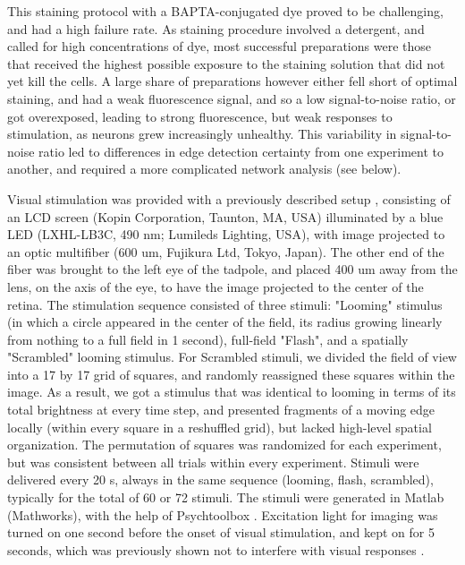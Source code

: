 \documentclass{article}
\begin{document}
This staining protocol with a BAPTA-conjugated dye proved to be challenging, and had a high failure rate. As staining procedure involved a detergent, and called for high concentrations of dye, most successful preparations were those that received the highest possible exposure to the staining solution that did not yet kill the cells. A large share of preparations however either fell short of optimal staining, and had a weak fluorescence signal, and so a low signal-to-noise ratio, or got overexposed, leading to strong fluorescence, but weak responses to stimulation, as neurons grew increasingly unhealthy. This variability in signal-to-noise ratio led to  differences in edge detection certainty from one experiment to another, and required a more complicated network analysis (see below).

Visual stimulation was provided with a previously described setup \citep{khakhalin2014}, consisting of an LCD screen (Kopin Corporation, Taunton, MA, USA) illuminated by a blue LED (LXHL-LB3C, 490 nm; Lumileds Lighting, USA), with image projected to an optic multifiber (600 um, Fujikura Ltd, Tokyo, Japan). The other end of the fiber was brought to the left eye of the tadpole, and placed 400 um away from the lens, on the axis of the eye, to have the image projected to the center of the retina. The stimulation sequence consisted of three stimuli: "Looming" stimulus (in which a circle appeared in the center of the field, its radius growing linearly from nothing to a full field in 1 second), full-field "Flash", and a spatially "Scrambled" looming stimulus. For Scrambled stimuli, we divided the field of view into a 17 by 17 grid of squares, and randomly reassigned these squares within the image. As a result, we got a stimulus that was identical to looming in terms of its total brightness at every time step, and presented fragments of a moving edge locally (within every square in a reshuffled grid), but lacked high-level spatial organization. The permutation of squares was randomized for each experiment, but was consistent between all trials within every experiment. Stimuli were delivered every 20 s, always in the same sequence (looming, flash, scrambled), typically for the total of 60 or 72 stimuli. The stimuli were generated in Matlab (Mathworks), with the help of Psychtoolbox \citep{kleiner2007psychtoolbox}. Excitation light for imaging was turned on one second before the onset of visual stimulation, and kept on for 5 seconds, which was previously shown not to interfere with visual responses \citep{xu2011}.
\end{document}
